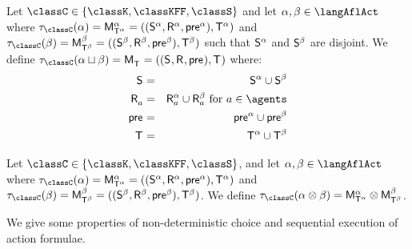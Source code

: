 \begin{definition}\label{afl-choice}
Let $\classC \in \{\classK, \classKFF, \classS\}$ and let $\alpha, \beta \in \langAflAct$ where $\tau_\classC(\alpha) = \aPModel[\alpha]{\aStatesT[\alpha]} = \aPModelTuple[\alpha]{\aStatesT[\alpha]}$ and $\tau_\classC(\beta) = \aPModel[\beta]{\aStatesT[\beta]} = \aPModelTuple[\beta]{\aStatesT[\beta]}$ such that $\aStates[\alpha]$ and $\aStates[\beta]$ are disjoint.
We define $\tau_\classC(\alpha \choice \beta) = \aPModel{\aStatesT} = \aPModelTuple{\aStatesT}$ where:
\begin{eqnarray*}
    \aStates &=& \aStates[\alpha] \cup \aStates[\beta]\\
    \aAccessibility{\agentA} &=& \aAccessibility[\alpha]{\agentA} \cup \aAccessibility[\beta]{\agentA} \text{ for } \agentA \in \agents\\
    \aPrecondition &=& \aPrecondition[\alpha] \cup \aPrecondition[\beta]\\
    \aStatesT &=& \aStatesT[\alpha] \cup \aStatesT[\beta]
\end{eqnarray*}
\end{definition}

\begin{definition}\label{afl-sequential}
Let $\classC \in \{\classK, \classKFF, \classS\}$, and let $\alpha, \beta \in \langAflAct$ where $\tau_\classC(\alpha) = \aPModel[\alpha]{\aStatesT[\alpha]} = \aPModelTuple[\alpha]{\aStatesT[\alpha]}$ and $\tau_\classC(\beta) = \aPModel[\beta]{\aStatesT[\beta]} = \aPModelTuple[\beta]{\aStatesT[\beta]}$.
We define $\tau_\classC(\alpha \compose \beta) = \aPModel[\alpha]{\aStatesT[\alpha]} \exec \aPModel[\beta]{\aStatesT[\beta]}$.
\end{definition}

We give some properties of non-deterministic choice and sequential execution
of action formulae.

